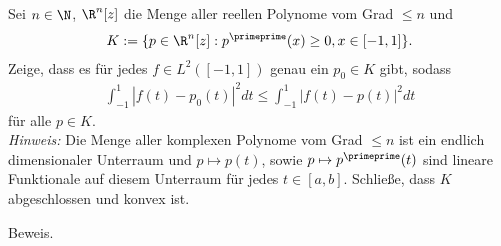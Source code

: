\begin{exercise}
Sei $n \in \N$, $\R^n[z]$ die Menge aller reellen Polynome vom Grad $\leq n$ und
\begin{align*}
  K := \{p \in \R^n[z]: p^{\primeprime}(x) \geq 0, x \in [-1,1]\}.
\end{align*}
Zeige, dass es für jedes $f \in L^2([-1,1])$ genau ein $p_0 \in K$ gibt, sodass
\begin{align*}
  \int_{-1}^{1}|f(t)-p_0(t)|^2 dt \leq \int_{-1}^1 |f(t) - p(t)|^2 dt
\end{align*}
für alle $p \in K$. \\
\textit{Hinweis:} Die Menge aller komplexen Polynome vom Grad $\leq n$ ist ein
endlich dimensionaler Unterraum und $p \mapsto p(t)$, sowie $p \mapsto p^{\primeprime}(t)$
sind lineare Funktionale auf diesem Unterraum für jedes $t \in [a,b]$. Schließe,
dass $K$ abgeschlossen und konvex ist.
\end{exercise}
\begin{solution}
Beweis.
\end{solution}
